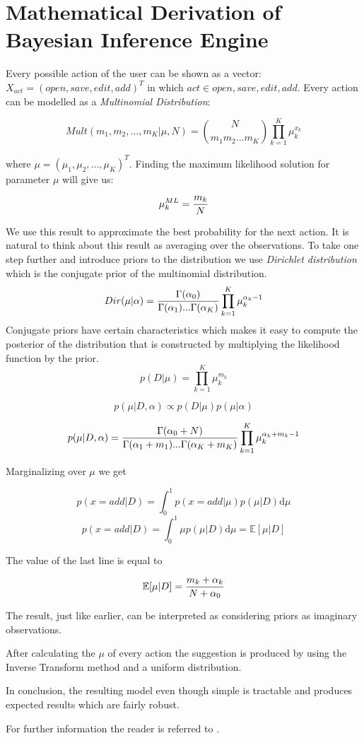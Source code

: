 \section{Mathematical Derivation of Bayesian Inference Engine}
Every possible action of the user can be shown as a vector: $X_{act}=(open, save, edit, add)^T$ in which  $act \in {open, save, edit, add}$. Every action can be modelled as a \textit{Multinomial Distribution}:

\[
Mult(m_1,m_2,...,m_K|\mu,N)={N \choose m_1 m_2 ... m_K}\prod_{k=1}^K \mu_{k}^{x_k}
\]

where $\mu=(\mu_1,\mu_2,...,\mu_K)^T$. Finding the maximum likelihood solution for parameter $\mu$ will give us:

\[
\mu_k^{ML}={m_k \over N} 
\]

We use this result to approximate the best probability for the next action. It is natural to think about this result as averaging over the observations.
To take one step further and introduce priors to the distribution we use \textit{Dirichlet distribution} which is the conjugate prior of the multinomial distribution.
\[
Dir(\mu|\alpha)={\Gamma(\alpha_0) \over \Gamma(\alpha_1)...\Gamma(\alpha_K)}\prod_{k=1}^K \mu_{k}^{\alpha_k -1}
\]
Conjugate priors have certain characteristics which makes it easy to compute the posterior of the distribution that is constructed by multiplying the likelihood function by the prior.  
\[
p(D|\mu)=\prod_{k=1}^K {\mu_{k}^{m_k}}\]

\[p(\mu| D,\alpha) \propto p(D|\mu)  p(\mu|\alpha)\]

\[p(\mu|D, \alpha)={\Gamma(\alpha_0+N) \over {\Gamma(\alpha_1+m_1)...\Gamma(\alpha_K+m_K)}}\prod_{k=1}^K \mu_{k}^{\alpha_k+m_k-1}\]

Marginalizing over $\mu$ we get 

\[p(x=add|D)=\int_0^1 p(x=add|\mu)p(\mu|D) \mathrm{d}\mu\]
\[p(x=add|D)=\int_0^1 \mu p(\mu|D)\mathrm{d}\mu = \mathbb{E}[\mu|D]\]

The value of the last line is equal to

\[\mathbb{E}[\mu|D]={m_k+\alpha_k \over {N+\alpha_0}} \]

The result, just like earlier, can be interpreted as considering priors as imaginary observations.

After calculating the $\mu$ of every action the suggestion is produced by using the Inverse Transform method and a uniform distribution.

In conclusion, the resulting model even though simple is tractable and produces expected results which are fairly robust.

For further information the reader is referred to \cite{Bishop2007}. 
